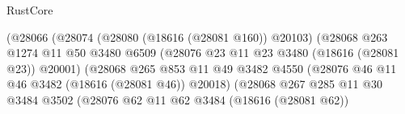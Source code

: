 \begin{lexlean}{RustCore}
\begin{coremodule}
                                            (@28066
                                              (@28074
                                                (@28080 (@18616 (@28081 @160)) @20103)
                                                (@28068
                                                  @263
                                                  @1274
                                                  @11
                                                  @50
                                                  @3480
                                                  @6509
                                                  (@28076
                                                    @23
                                                    @11
                                                    @23
                                                    @3480
                                                    (@18616 (@28081 @23))
                                                    @20001)
                                                  (@28068
                                                    @265
                                                    @853
                                                    @11
                                                    @49
                                                    @3482
                                                    @4550
                                                    (@28076
                                                      @46
                                                      @11
                                                      @46
                                                      @3482
                                                      (@18616 (@28081 @46))
                                                      @20018)
                                                    (@28068
                                                      @267
                                                      @285
                                                      @11
                                                      @30
                                                      @3484
                                                      @3502
                                                      (@28076
                                                        @62
                                                        @11
                                                        @62
                                                        @3484
                                                        (@18616 (@28081 @62))

\end{coremodule}
\end{lexlean}
